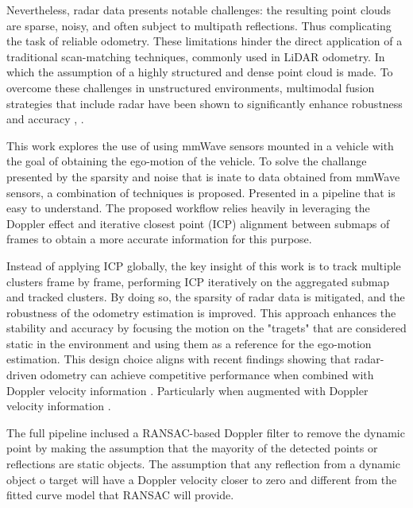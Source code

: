Nevertheless, radar data presents notable challenges: the resulting point clouds are sparse, noisy, and often subject to multipath reflections. 
Thus complicating the task of reliable odometry.  
These limitations hinder the direct application of a traditional scan-matching techniques, commonly used in LiDAR odometry. In which the assumption of a highly structured and dense point cloud is made.
To overcome these challenges in unstructured environments, multimodal fusion strategies that include radar have been shown to significantly enhance robustness and accuracy \cite{Multimodal_Offroad}, \cite{HighSpeed_Estimation}.

This work explores the use of using mmWave sensors mounted in a vehicle with the goal of obtaining the ego-motion of the vehicle.
To solve the challange presented by the sparsity and noise that is inate to data obtained from mmWave sensors, a combination of techniques is proposed. 
Presented in a pipeline that is easy to understand.
The proposed workflow relies heavily in leveraging the Doppler effect and iterative closest point (ICP) alignment between submaps of frames to obtain a more accurate information for this purpose.

Instead of applying ICP globally, the key insight of this work is to track multiple clusters frame by frame, performing ICP iteratively on the aggregated submap and tracked clusters. 
By doing so, the sparsity of radar data is mitigated, and the robustness of the odometry estimation is improved.
This approach enhances the stability and accuracy by focusing the motion on the "tragets" that are considered static in the environment and using them as a reference for the ego-motion estimation.
This design choice aligns with recent findings showing that radar-driven odometry can achieve competitive performance when combined with Doppler velocity information \cite{Odometry_radar_only}.
Particularly when augmented with Doppler velocity information \cite{HighSpeed_Estimation}.

The full pipeline inclused a RANSAC-based Doppler filter to remove the dynamic point by making the assumption that the mayority of the detected points or reflections are static objects. 
The assumption that any reflection from a dynamic object o target will have a Doppler velocity closer to zero and different from the fitted curve model that RANSAC will provide.

